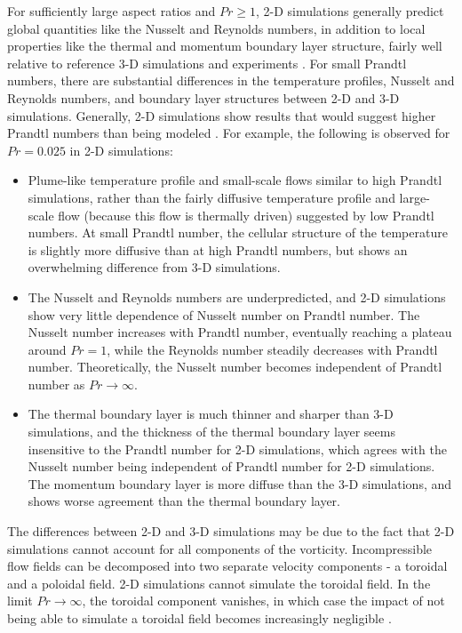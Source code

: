 \documentclass[10pt]{article}
\numberwithin{equation}{section} %
\begin{document}
For sufficiently large aspect ratios and \(Pr\geq1\), 2-D simulations generally predict global quantities like the Nusselt and Reynolds numbers, in addition to local properties like the thermal and momentum boundary layer structure, fairly well relative to reference 3-D simulations and experiments \cite{poel,schmalzl}. For small Prandtl numbers, there are substantial differences in the temperature profiles, Nusselt and Reynolds numbers, and boundary layer structures between 2-D and 3-D simulations. Generally, 2-D simulations show results that would suggest higher Prandtl numbers than being modeled \cite{schmalzl}. For example, the following is observed for \(Pr=0.025\) in 2-D simulations:

\begin{itemize}
\item Plume-like temperature profile and small-scale flows similar to high Prandtl simulations, rather than the fairly diffusive temperature profile and large-scale flow (because this flow is thermally driven) suggested by low Prandtl numbers. At small Prandtl number, the cellular structure of the temperature is slightly more diffusive than at high Prandtl numbers, but shows an overwhelming difference from 3-D simulations.
\item The Nusselt and Reynolds numbers are underpredicted, and 2-D simulations show very little dependence of Nusselt number on Prandtl number. The Nusselt number increases with Prandtl number, eventually reaching a plateau around \(Pr=1\), while the Reynolds number steadily decreases with Prandtl number. Theoretically, the Nusselt number becomes independent of Prandtl number as \(Pr\rightarrow\infty\).
\item The thermal boundary layer is much thinner and sharper than 3-D simulations, and the thickness of the thermal boundary layer seems insensitive to the Prandtl number for 2-D simulations, which agrees with the Nusselt number being independent of Prandtl number for 2-D simulations. The momentum boundary layer is more diffuse than the 3-D simulations, and shows worse agreement than the thermal boundary layer.
\end{itemize}

The differences between 2-D and 3-D simulations may be due to the fact that 2-D simulations cannot account for all components of the vorticity. Incompressible flow fields can be decomposed into two separate velocity components - a toroidal and a poloidal field. 2-D simulations cannot simulate the toroidal field. In the limit \(Pr\rightarrow\infty\), the toroidal component vanishes, in which case the impact of not being able to simulate a toroidal field becomes increasingly negligible \cite{schmalzl}. 
\end{document}
